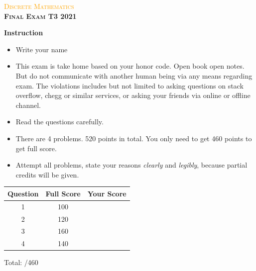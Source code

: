 \documentclass[a4paper, 12pt]{article}
\begin{document}
\begin{center}
	\textcolor{orange}{\textsc{Discrete Mathematics}}\\
	\huge\textbf{\textsc{Final Exam T3 2021}}\\
\end{center}

\textbf{Instruction}
\begin{itemize}
\item Write your name
\item This exam is take home based on your honor code. Open book open notes. But do not communicate with another human being via any means regarding exam. The violations includes but not limited to asking questions on stack overflow, chegg or similar services, or asking your friends via online or offline channel.
\item Read the questions carefully.
\item There are 4 problems. 520 points in total. You only need to get 460 points to get full score.
\item Attempt all problems, state your reasons \emph{clearly} and \emph{legibly}, because partial credits will be given.
\end{itemize}
\vspace{0.25in}

	\begin{center}
		\def\arraystretch{1.5}
		\begin{tabular}{|c|c|c|}
			\hline Question & Full Score & Your Score  \\ 
			\hline  1 & 100 &  \\ 
			\hline  2 & 120 &  \\ 
			\hline  3 & 160 &  \\
			\hline  4 & 140 & \\
			\hline 
		\end{tabular} 
	\end{center}
	

	\def\arraystretch{1.0}


\begin{center}
Total:\; \fbox{ \begin{minipage}{1in} \hfill\vspace{1in} \end{minipage} }/460
\end{center}
\pagebreak
\end{document}
